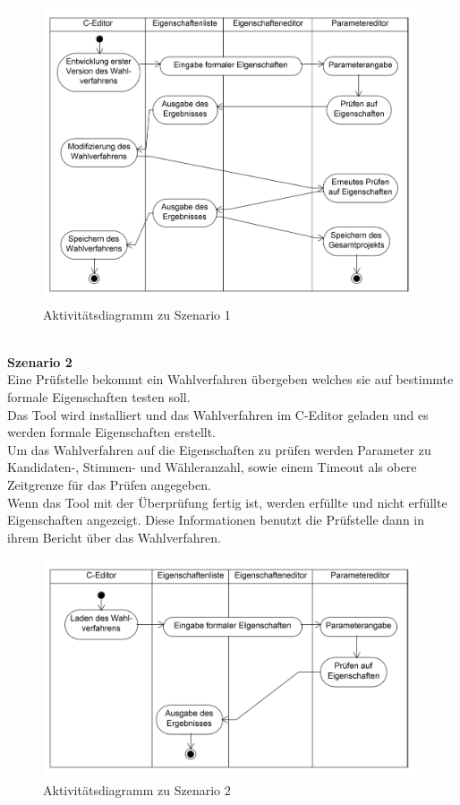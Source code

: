 \documentclass[a4paper]{scrreprt}
\begin{document}
\begin{figure}[H]
\includegraphics[scale=0.12]{ActivityDiagramScenario1.png}
\caption{Aktivitätsdiagramm zu Szenario 1}
\label{Packet-scetch}
\end{figure}
\\
\textbf{Szenario 2}\\
Eine Prüfstelle bekommt ein Wahlverfahren übergeben welches sie auf bestimmte formale Eigenschaften testen soll.\\
Das Tool wird installiert und das Wahlverfahren im C-Editor geladen und es werden formale Eigenschaften erstellt.\\
Um das Wahlverfahren auf die Eigenschaften zu prüfen werden Parameter zu \\Kandidaten-, Stimmen- und Wähleranzahl, sowie einem Timeout als obere Zeitgrenze für das Prüfen angegeben.\\
Wenn das Tool mit der Überprüfung fertig ist, werden erfüllte und nicht erfüllte Eigenschaften angezeigt. Diese Informationen benutzt die Prüfstelle dann in ihrem Bericht über das Wahlverfahren.\\

\begin{figure}[H]
\includegraphics[scale=0.12]{ActivityDiagramScenario2.png}
\caption{Aktivitätsdiagramm zu Szenario 2}
\label{Packet-scetch}
\end{figure}
\end{document}
